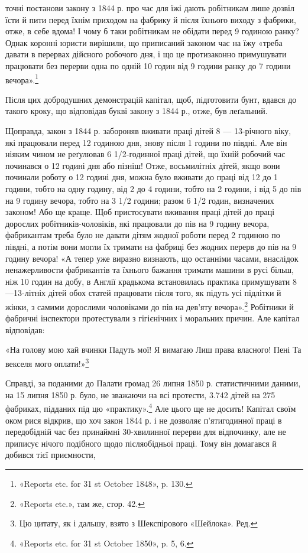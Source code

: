\parcont{}  %
точні постанови закону з 1844 р. про час для їжі дають робітникам
лише дозвіл їсти й пити перед їхнім приходом на фабрику
й після їхнього виходу з фабрики, отже, в себе вдома! І чому б
таки робітникам не обідати перед 9 годиною ранку? Однак коронні
юристи вирішили, що приписаний законом час на їжу «треба
давати в перервах дійсного робочого дня, і що це протизаконно
примушувати працювати без перерви одна по одній 10 годин
від 9 години ранку до 7 години вечора».\footnote{
«Reports etc. for 31 st October 1848», p. 130.
}

Після цих добродушних демонстрацій капітал, щоб, підготовити
бунт, вдався до такого кроку, що відповідав букві закону
з 1844 р., отже, був леґальний.

Щоправда, закон з 1844 р. забороняв вживати праці дітей 8 —
13-річного віку, які працювали перед 12 годиною дня, знову після
1 години по півдні. Але він ніяким чином не реґулював 6 1/2-годинної
праці дітей, що їхній робочий час починався о 12 годині
дня або пізніш! Отже, восьмилітніх дітей, якщо вони починали
роботу о 12 годині дня, можна було вживати до праці від 12 до
1 години, тобто на одну годину, від 2 до 4 години, тобто на 2 години,
і від 5 до пів на 9 годину вечора, тобто на 3 1/2 години; разом
6 1/2 годин, визначених законом! Або ще краще. Щоб пристосувати
вживання праці дітей до праці дорослих робітників-чоловіків, які
працювали до пів на 9 годину вечора, фабрикантам треба було не
давати дітям жодної роботи перед 2 годиною по півдні, а потім вони
могли їх тримати на фабриці без жодних перерв до пів на 9 годину
вечора! «А тепер уже виразно визнають, що останніми часами,
внаслідок ненажерливости фабрикантів та їхнього бажання тримати
машини в русі більш, ніж 10 годин на добу, в Англії крадькома
встановилась практика примушувати 8—13-літніх дітей
обох статей працювати після того, як підуть усі підлітки й жінки,
з самими дорослими чоловіками до пів на дев’яту вечора».\footnote{
«Reports etc.», там же, стор. 42.
}
Робітники й фабричні інспектори протестували з гігієнічних і
моральних причин. Але капітал відповідав:

«На голову мою хай вчинки
Падуть мої! Я вимагаю
Лиш права власного! Пені
Та векселя мого оплати!»\footnote*{
Цю цитату, як і дальшу, взято з Шекспірового «Шейлока». Ред.
}

Справді, за поданими до Палати громад 26 липня 1850 р.
статистичними даними, на 15 липня 1850 р. було, не зважаючи
на всі протести, 3.742 дітей на 275 фабриках, підданих під цю
«практику».\footnote{
«Reports etc. for 31 st October 1850», p. 5, 6.
} Але цього ще не досить! Капітал своїм оком
рися відкрив, що хоч закон 1844 р. і не дозволяє п’ятигодинної
праці в передобідній час без принаймні 30-хвилинної перерви
для відпочинку, але не приписує нічого подібного щодо післяобідньої
праці. Тому він домагався й добився тієї приємности,
\parbreak{}  %
